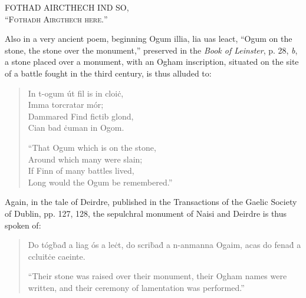 \documentclass[11pt,oneside]{memoir}
\begin{document}
\begin{center}
    \LARGE \gaelicfont FOTHAD AIRCTHECH IND SO, \\
    \large \normalfont ``\textsc{Fothadh Airgthech here.}''
\end{center}

Also in a very ancient poem, beginning \gaelicfont Ogum illia, lia uas leact, \normalfont ``Ogum on the stone, the stone over the monument,'' preserved in the \textit{Book of Leinster}, p. 28, \textit{b}, a stone placed over a monument, with an Ogham inscription, situated on the site of a battle fought in the third century, is thus alluded to: 

\begin{verse}
    \gaelicfont
    In t-ogum út fil is in cloiċ, \\
    Imma torcratar mór; \\
    Dammared Find fictib glond, \\
    Cian bad ċuman in Ogom.

    \normalfont
    ``That Ogum which is on the stone, \\
    Around which many were slain; \\
    If Finn of many battles lived, \\
    Long would the Ogum be remembered.''
\end{verse}


Again, in the tale of Deirdre, published in the Transactions of the Gaelic Society of Dublin, pp. 127, 128, the sepulchral monument of Naisi and Deirdre is thus spoken of: 

\begin{verse}
    \gaelicfont
    Do tógḃaḋ a liag ós a leċt, do scriḃaḋ a n-anmanna Ogaim, acas do fenaḋ a ccluiṫċe caeinte.

    \normalfont
    ``Their stone was raised over their monument, their Ogham names were written, and their ceremony of lamentation was performed.''
\end{verse}
\end{document}
